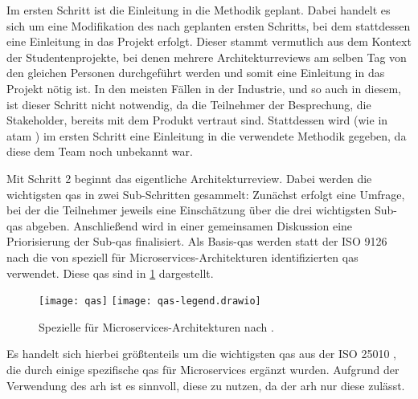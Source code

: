 Im ersten Schritt ist die Einleitung in die Methodik geplant.
Dabei handelt es sich um eine Mo\-di\-fi\-ka\-ti\-on des nach  geplanten ersten Schritts, bei dem stattdessen eine Einleitung in das Projekt erfolgt.
Dieser stammt vermutlich aus dem Kontext der Studentenprojekte, bei denen mehrere Architekturreviews am selben Tag von den gleichen Personen durchgeführt werden und somit eine Einleitung in das Projekt nötig ist.
In den meisten Fällen in der Industrie, und so auch in diesem, ist dieser Schritt nicht notwendig, da die Teilnehmer der Besprechung, die Stakeholder, bereits mit dem Produkt vertraut sind.
Stattdessen wird (wie in \gls{atam} \cite{kazman_2000}) im ersten Schritt eine Einleitung in die verwendete Methodik gegeben, da diese dem Team noch unbekannt war.

Mit Schritt 2 beginnt das eigentliche Architekturreview.
Dabei werden die wichtigsten \glspl{qa} in zwei Sub-Schritten gesammelt:
Zunächst erfolgt eine Umfrage, bei der die Teilnehmer jeweils eine Einschätzung über die drei wichtigsten Sub-\glspl{qa} abgeben.
Anschließend wird in einer gemeinsamen Diskussion eine Priorisierung der Sub-\glspl{qa} finalisiert.
Als Basis-\glspl{qa} werden statt der ISO 9126~\cite{ISO-9126} nach  die von  speziell für Microservices-Architekturen identifizierten \glspl{qa} verwendet.
Diese \glspl{qa} sind in \cref{fig:qas} dargestellt.
\begin{figure}[!h]
	\centering
	\texttt{[image: qas]}
	\texttt{[image: qas-legend.drawio]}
	\caption[Spezielle  für Microservices-Architekturen]{
		Spezielle  für Microservices-Architekturen nach .
	}
	\label{fig:qas}
\end{figure}
Es handelt sich hierbei größtenteils um die wichtigsten \glspl{qa} aus der ISO 25010 \cite{ISO-25010}, die durch einige spezifische \glspl{qa} für Microservices ergänzt wurden.
Aufgrund der Verwendung des \gls{arh} ist es sinnvoll, diese zu nutzen, da der \gls{arh} nur diese zulässt.

